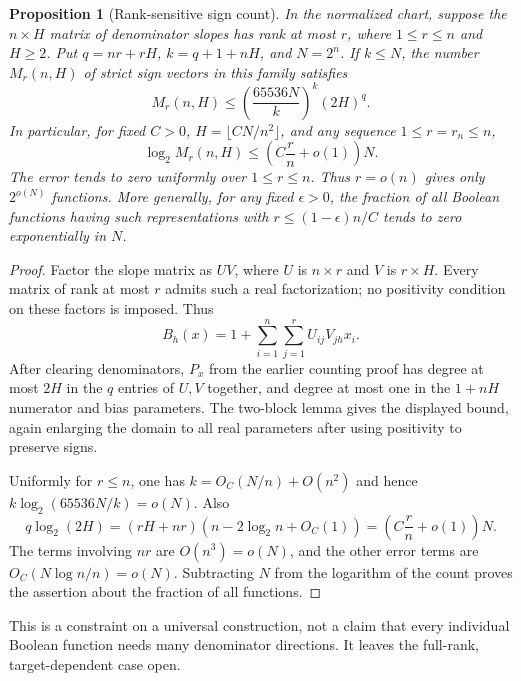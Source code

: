 \documentclass[11pt]{article}
\newtheorem{proposition}{Proposition}
\begin{document}
\begin{proposition}[Rank-sensitive sign count]
In the normalized chart, suppose the $n\times H$ matrix of denominator
slopes has rank at most $r$, where $1\le r\le n$ and $H\ge2$.
Put $q=nr+rH$, $k=q+1+nH$, and $N=2^n$. If $k\le N$, the number
$M_r(n,H)$ of strict sign vectors in this family satisfies
\[
 M_r(n,H)\le \left(\frac{65536N}{k}\right)^k(2H)^q.
\]
In particular, for fixed $C>0$, $H=\lfloor CN/n^2\rfloor$, and any
sequence $1\le r=r_n\le n$,
\[
 \log_2 M_r(n,H)\le\left(C\frac r n+o(1)\right)N.
\]
The error tends to zero uniformly over $1\le r\le n$.
Thus $r=o(n)$ gives only $2^{o(N)}$ functions. More generally, for any
fixed $\epsilon>0$, the fraction of all Boolean functions having such
representations with $r\le(1-\epsilon)n/C$ tends to zero exponentially
in $N$.
\end{proposition}
\begin{proof}
Factor the slope matrix as $UV$, where $U$ is $n\times r$ and $V$ is
$r\times H$. Every matrix of rank at most $r$ admits such a real
factorization; no positivity condition on these factors is imposed.
Thus
\[
 B_h(x)=1+\sum_{i=1}^n\sum_{j=1}^r U_{ij}V_{jh}x_i.
\]
After clearing denominators, $P_x$ from the earlier counting proof has
degree at most $2H$ in the $q$ entries of $U,V$ together, and degree
at most one in the $1+nH$ numerator and bias parameters. The two-block
lemma gives the displayed bound, again enlarging the domain to all
real parameters after using positivity to preserve signs.

Uniformly for $r\le n$, one has $k=O_C(N/n)+O(n^2)$ and hence
$k\log_2(65536N/k)=o(N)$. Also
\[
 q\log_2(2H)
 =(rH+nr)(n-2\log_2n+O_C(1))
 =\left(C\frac r n+o(1)\right)N.
\]
The terms involving $nr$ are $O(n^3)=o(N)$, and the other error
terms are $O_C(N\log n/n)=o(N)$. Subtracting $N$ from the logarithm
of the count proves the assertion about the fraction of all functions.
\end{proof}

This is a constraint on a universal construction, not a claim that
every individual Boolean function needs many denominator directions.
It leaves the full-rank, target-dependent case open.
\end{document}
